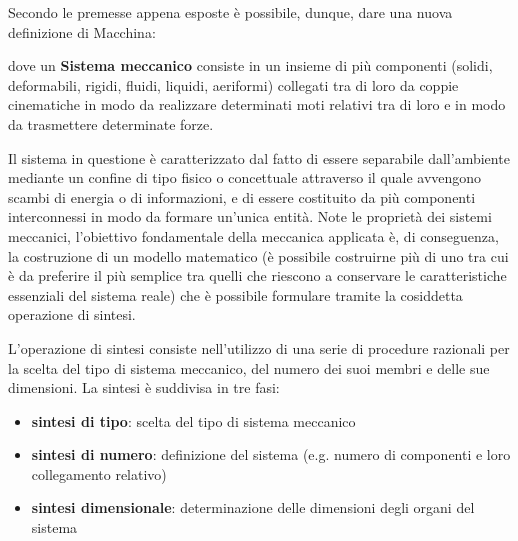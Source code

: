 Secondo le premesse appena esposte è possibile, dunque, dare una nuova definizione di Macchina:

dove un \textbf{Sistema meccanico} consiste in un insieme di più componenti (solidi, deformabili, rigidi, fluidi, liquidi, aeriformi) collegati tra di loro da coppie cinematiche in modo da realizzare determinati moti relativi tra di loro e in modo da trasmettere determinate forze.
     
Il sistema in questione è caratterizzato dal fatto di essere separabile dall'ambiente mediante un confine di tipo fisico o concettuale attraverso il quale avvengono scambi di energia o di informazioni, e di essere costituito da più componenti interconnessi in modo da formare un'unica entità.
Note le proprietà dei sistemi meccanici, l'obiettivo fondamentale della meccanica applicata è, di conseguenza, la costruzione di un modello matematico (è possibile costruirne più di uno tra cui è da preferire il più semplice tra quelli che riescono a conservare le caratteristiche essenziali del sistema reale) che è possibile formulare tramite la cosiddetta operazione di sintesi.

L'operazione di sintesi consiste nell'utilizzo di una serie di procedure razionali per la scelta del tipo di sistema meccanico, del numero dei suoi membri e delle sue dimensioni.
La sintesi è suddivisa in tre fasi:
\begin{itemize}
    \item \textbf{sintesi di tipo}: scelta del tipo di sistema meccanico 
    \item \textbf{sintesi di numero}: definizione del sistema (e.g. numero di componenti e loro collegamento relativo)
    \item \textbf{sintesi dimensionale}: determinazione delle dimensioni degli organi del sistema
\end{itemize}


